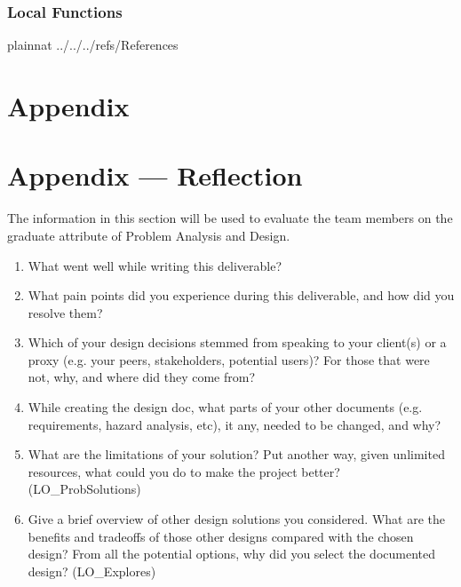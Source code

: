 \documentclass[12pt, titlepage]{article}
\begin{document}


\subsubsection{Local Functions}

 

\newpage

 {plainnat}
 {../../../refs/References}

\newpage

\section{Appendix} \label{Appendix}


\newpage{}

\section*{Appendix --- Reflection}

The information in this section will be used to evaluate the team members on the
graduate attribute of Problem Analysis and Design.



\begin{enumerate}
  \item What went well while writing this deliverable? 
  \item What pain points did you experience during this deliverable, and how
    did you resolve them?
  \item Which of your design decisions stemmed from speaking to your client(s)
  or a proxy (e.g. your peers, stakeholders, potential users)? For those that
  were not, why, and where did they come from?
  \item While creating the design doc, what parts of your other documents (e.g.
  requirements, hazard analysis, etc), it any, needed to be changed, and why?
  \item What are the limitations of your solution?  Put another way, given
  unlimited resources, what could you do to make the project better? (LO\_ProbSolutions)
  \item Give a brief overview of other design solutions you considered.  What
  are the benefits and tradeoffs of those other designs compared with the chosen
  design?  From all the potential options, why did you select the documented design?
  (LO\_Explores)
\end{enumerate}
\end{document}
